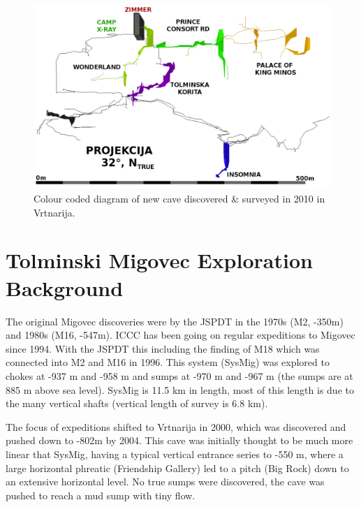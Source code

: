 \documentclass[english,a4]{article}
\begin{document}
\begin{center}
%
\begin{figure}
\centering
\includegraphics[width=0.85\columnwidth]{2010_deep_vrtnarija_colour_coded_inverted_labelled}

\caption{Colour coded diagram of new cave discovered \& surveyed in 2010 in
Vrtnarija.}



\end{figure}

\par\end{center}


\section{Tolminski Migovec Exploration Background}

The original Migovec discoveries were by the JSPDT in the 1970s (M2,
-350m) and 1980s (M16, -547m). ICCC has been going on regular expeditions
to Migovec since 1994. With the JSPDT this including the finding of
M18 which was connected into M2 and M16 in 1996. This system (SysMig)
was explored to chokes at -937 m and -958 m and sumps at -970 m and
-967 m (the sumps are at 885 m above sea level). SysMig is 11.5 km
in length, most of this length is due to the many vertical shafts
(vertical length of survey is 6.8 km).

The focus of expeditions shifted to Vrtnarija in 2000, which was discovered
and pushed down to -802m by 2004. This cave was initially thought
to be much more linear that SysMig, having a typical vertical entrance
series to -550 m, where a large horizontal phreatic (Friendship Gallery)
led to a pitch (Big Rock) down to an extensive horizontal level. No
true sumps were discovered, the cave was pushed to reach a mud sump
with tiny flow.
\end{document}

